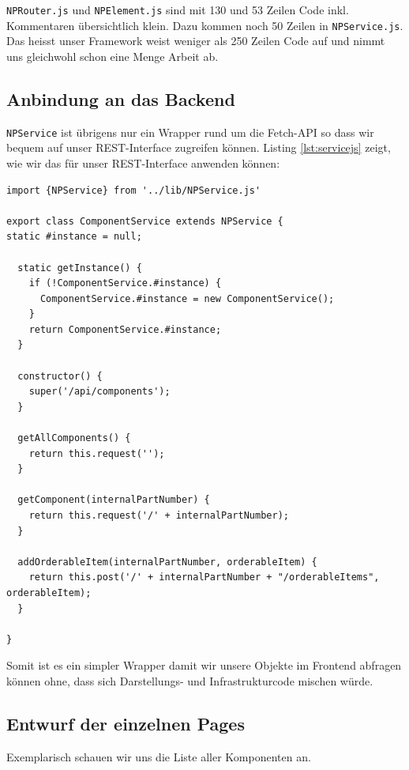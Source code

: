 \texttt{NPRouter.js} und \texttt{NPElement.js} sind mit 130 und 53 Zeilen Code
inkl. Kommentaren übersichtlich klein. Dazu kommen noch 50 Zeilen in 
\texttt{NPService.js}. Das heisst unser Framework weist weniger als 250 Zeilen
Code auf und nimmt uns gleichwohl schon eine Menge Arbeit ab.

\subsection{Anbindung an das Backend}

\texttt{NPService} ist übrigens nur ein Wrapper rund um die Fetch-API so dass
wir bequem auf unser REST-Interface zugreifen können. Listing 
{\ref{lst:servicejs}} zeigt, wie wir das für unser REST-Interface anwenden
können:

\begin{listing}[H]
\begin{verbatim}
import {NPService} from '../lib/NPService.js'

export class ComponentService extends NPService {
static #instance = null;

  static getInstance() {
    if (!ComponentService.#instance) {
      ComponentService.#instance = new ComponentService();
    }
    return ComponentService.#instance;
  }

  constructor() {
    super('/api/components');
  }

  getAllComponents() {
    return this.request('');
  }

  getComponent(internalPartNumber) {
    return this.request('/' + internalPartNumber);
  }

  addOrderableItem(internalPartNumber, orderableItem) {
    return this.post('/' + internalPartNumber + "/orderableItems", orderableItem);
  }
  
}
\end{verbatim}
\caption{ComponentService.js}
\label{lst:servicejs}
\end{listing}

Somit ist es ein simpler Wrapper damit wir unsere Objekte im Frontend
abfragen können ohne, dass sich Darstellungs- und Infrastrukturcode
mischen würde.

\subsection{Entwurf der einzelnen Pages}

Exemplarisch schauen wir uns die Liste aller Komponenten an.

